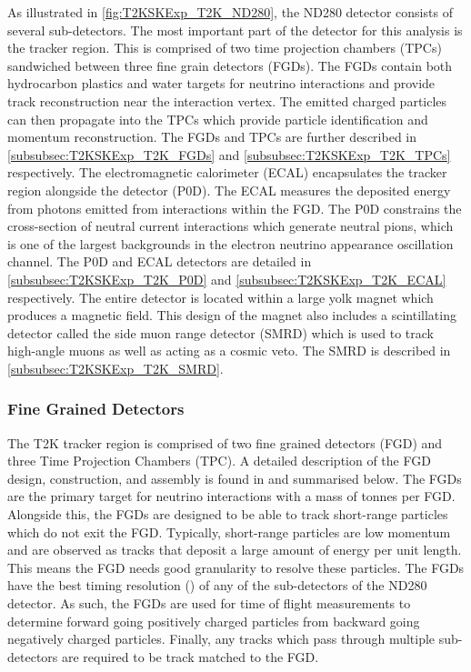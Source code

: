 As illustrated in \autoref{fig:T2KSKExp_T2K_ND280}, the ND280 detector consists of several sub-detectors. The most important part of the detector for this analysis is the tracker region. This is comprised of two time projection chambers (TPCs) sandwiched between three fine grain detectors (FGDs). The FGDs contain both hydrocarbon plastics and water targets for neutrino interactions and provide track reconstruction near the interaction vertex. The emitted charged particles can then propagate into the TPCs which provide particle identification and momentum reconstruction. The FGDs and TPCs are further described in \autoref{subsubsec:T2KSKExp_T2K_FGDs} and \autoref{subsubsec:T2KSKExp_T2K_TPCs} respectively. The electromagnetic calorimeter (ECAL) encapsulates the tracker region alongside the  detector (P0D). The ECAL measures the deposited energy from photons emitted from interactions within the FGD. The P0D constrains the cross-section of neutral current interactions which generate neutral pions, which is one of the largest backgrounds in the electron neutrino appearance oscillation channel. The P0D and ECAL detectors are detailed in \autoref{subsubsec:T2KSKExp_T2K_P0D} and \autoref{subsubsec:T2KSKExp_T2K_ECAL} respectively. The entire detector is located within a large yolk magnet which produces a  magnetic field. This design of the magnet also includes a scintillating detector called the side muon range detector (SMRD) which is used to track high-angle muons as well as acting as a cosmic veto. The SMRD is described in \autoref{subsubsec:T2KSKExp_T2K_SMRD}.  

\subsubsection{Fine Grained Detectors}
\label{subsubsec:T2KSKExp_T2K_FGDs}

The T2K tracker region is comprised of two fine grained detectors (FGD) and three Time Projection Chambers (TPC). A detailed description of the FGD design, construction, and assembly is found in \cite{Amaudruz2012} and summarised below. The FGDs are the primary target for neutrino interactions with a mass of  tonnes per FGD.
Alongside this, the FGDs are designed to be able to track short-range particles which do not exit the FGD. Typically, short-range particles are low momentum and are observed as tracks that deposit a large amount of energy per unit length. This means the FGD needs good granularity to resolve these particles. The FGDs have the best timing resolution () of any of the sub-detectors of the ND280 detector. As such, the FGDs are used for time of flight measurements to determine forward going positively charged particles from backward going negatively charged particles. Finally, any tracks which pass through multiple sub-detectors are required to be track matched to the FGD.

